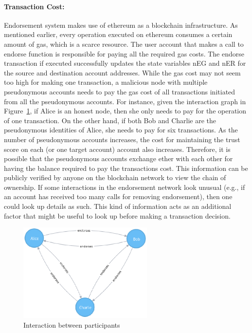 \paragraph{Transaction Cost:}Endorsement system makes use of ethereum as a
blockchain infrastructure. As mentioned earlier, every operation executed on
ethereum consumes a certain amount of gas, which is a scarce resource. The user
account that makes a call to endorse function is responsible for paying all the
required gas costs. The endorse transaction if executed successfully updates
the state variables \ac{nEG} and \ac{nER} for the source and destination
account addresses. While the gas cost may not seem too high for making one
transaction, a malicious node with multiple pseudonymous accounts needs to pay
the gas cost of all transactions initiated from all the pseudonymous accounts.
For instance, given the interaction graph in Figure~\ref{fig:subgraphexample}, if
Alice is an honest node, then she only needs to pay for the operation of one
transaction. On the other hand, if both Bob and Charlie are the pseudonymous
identities of Alice, she needs to pay for six transactions. As the number of
pseudonymous accounts increases, the cost for maintaining the trust score on
each (or one target account) account also increases. Therefore, it is possible
that the pseudonymous accounts exchange ether with each other for having the
balance required to pay the transactions cost. This information can be publicly
verified by anyone on the blockchain network to view the chain of ownership. If
some interactions in the endorsement network look unusual (e.g., if an account
has received too many calls for removing endorsement), then one could look up
details as such. This kind of information acts as an additional factor that
might be useful to look up before making a transaction decision. 
\begin{figure}
	\centering
	\includegraphics[width=0.6\textwidth ]{Images/subgraphexample.eps}
	\caption{Interaction between participants}
	\label{fig:subgraphexample}
\end{figure}
